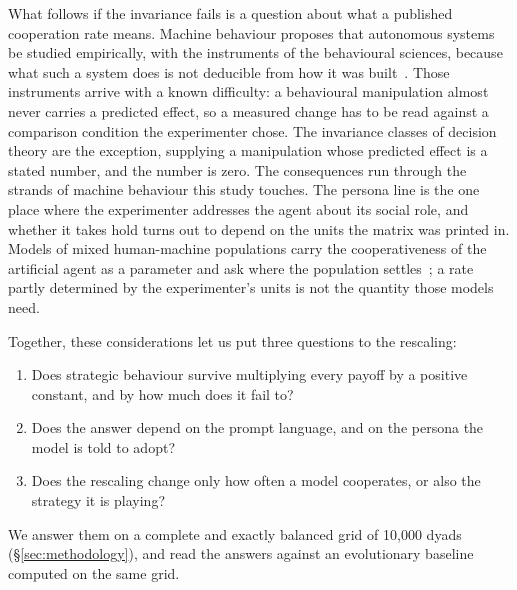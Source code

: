 \documentclass[11pt,a4paper]{article}
\begin{document}
What follows if the invariance fails is a question about what a published
cooperation rate means. Machine behaviour proposes that autonomous systems be
studied empirically, with the instruments of the behavioural sciences, because
what such a system does is not deducible from how it was
built~\cite{rahwan2019machine}. Those instruments arrive with a known
difficulty: a behavioural manipulation almost never carries a predicted effect,
so a measured change has to be read against a comparison condition the
experimenter chose. The invariance classes of decision theory are the
exception, supplying a manipulation whose predicted effect is a stated number,
and the number is zero. The consequences run through the strands of machine
behaviour this study touches. The persona line is the one place where the
experimenter addresses the agent about its social role, and whether it takes
hold turns out to depend on the units the matrix was printed in. Models of
mixed human-machine populations carry the cooperativeness of the artificial agent as
a parameter and ask where the population
settles~\cite{santos2018social,han2011intention,han2013good,perc2017statistical,paiva2018engineering};
a rate partly determined by the experimenter's units is not the quantity those
models need.

Together, these considerations let us put three questions to the rescaling:
\begin{enumerate}[(1)]
\item Does strategic behaviour survive multiplying every payoff by a positive
      constant, and by how much does it fail to?
\item Does the answer depend on the prompt language, and on the persona the
      model is told to adopt?
\item Does the rescaling change only how often a model cooperates, or also the
      strategy it is playing?
\end{enumerate}
We answer them on a complete and exactly balanced grid of 10{,}000 dyads
(\S\ref{sec:methodology}), and read the answers against an evolutionary
baseline computed on the same grid.
\end{document}
